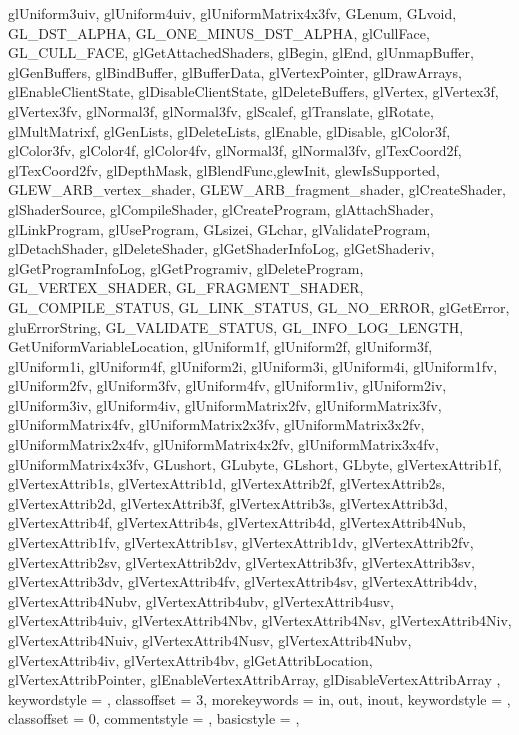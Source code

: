 {{{        glUniform3uiv,
        glUniform4uiv,
        glUniformMatrix4x3fv,
		GLenum,
		GLvoid, GL_DST_ALPHA, GL_ONE_MINUS_DST_ALPHA, glCullFace, GL_CULL_FACE, glGetAttachedShaders,
		glBegin, glEnd,
		glUnmapBuffer, glGenBuffers, glBindBuffer, glBufferData, glVertexPointer, glDrawArrays, glEnableClientState, glDisableClientState, glDeleteBuffers,
		glVertex, glVertex3f, glVertex3fv, glNormal3f, glNormal3fv, glScalef, glTranslate, glRotate, glMultMatrixf, glGenLists, glDeleteLists, glEnable, glDisable,
		glColor3f, glColor3fv, glColor4f, glColor4fv,
		glNormal3f, glNormal3fv,
		glTexCoord2f, glTexCoord2fv, glDepthMask, glBlendFunc,glewInit, glewIsSupported, GLEW_ARB_vertex_shader, GLEW_ARB_fragment_shader,
		glCreateShader, glShaderSource, glCompileShader, glCreateProgram, glAttachShader, glLinkProgram, glUseProgram, GLsizei, GLchar, glValidateProgram, glDetachShader, glDeleteShader,
		glGetShaderInfoLog, glGetShaderiv, glGetProgramInfoLog, glGetProgramiv, glDeleteProgram, GL_VERTEX_SHADER, GL_FRAGMENT_SHADER, GL_COMPILE_STATUS, GL_LINK_STATUS, GL_NO_ERROR, glGetError,
		gluErrorString, GL_VALIDATE_STATUS, GL_INFO_LOG_LENGTH, GetUniformVariableLocation, glUniform1f, glUniform2f, glUniform3f, glUniform1i,
		glUniform4f, glUniform2i, glUniform3i, glUniform4i,
		glUniform1fv, glUniform2fv, glUniform3fv, glUniform4fv,
		glUniform1iv, glUniform2iv, glUniform3iv, glUniform4iv,
		glUniformMatrix2fv, glUniformMatrix3fv, glUniformMatrix4fv, glUniformMatrix2x3fv, glUniformMatrix3x2fv, glUniformMatrix2x4fv, glUniformMatrix4x2fv, glUniformMatrix3x4fv, glUniformMatrix4x3fv,
		GLushort, GLubyte, GLshort, GLbyte,
		glVertexAttrib1f, glVertexAttrib1s, glVertexAttrib1d,
		glVertexAttrib2f, glVertexAttrib2s, glVertexAttrib2d,
		glVertexAttrib3f, glVertexAttrib3s, glVertexAttrib3d,
		glVertexAttrib4f, glVertexAttrib4s, glVertexAttrib4d, glVertexAttrib4Nub,
		glVertexAttrib1fv, glVertexAttrib1sv, glVertexAttrib1dv,
		glVertexAttrib2fv, glVertexAttrib2sv, glVertexAttrib2dv,
		glVertexAttrib3fv, glVertexAttrib3sv, glVertexAttrib3dv,
		glVertexAttrib4fv, glVertexAttrib4sv, glVertexAttrib4dv, glVertexAttrib4Nubv,
		glVertexAttrib4ubv, glVertexAttrib4usv, glVertexAttrib4uiv, glVertexAttrib4Nbv, glVertexAttrib4Nsv, glVertexAttrib4Niv, glVertexAttrib4Nuiv, glVertexAttrib4Nusv, glVertexAttrib4Nubv,
		glVertexAttrib4iv, glVertexAttrib4bv, glGetAttribLocation, glVertexAttribPointer, glEnableVertexAttribArray, glDisableVertexAttribArray
		}, keywordstyle = {\color[rgb]{1.0, 0.0, 0.6}},
		classoffset = 3,
		morekeywords = {in, out, inout}, keywordstyle = {\color[rgb]{1.0, 0.0, 0.0}},
		classoffset = 0,
		commentstyle = {\color[rgb]{0.0, 0.5, 0.0}},
		basicstyle = \tiny,
	}
	
	
}